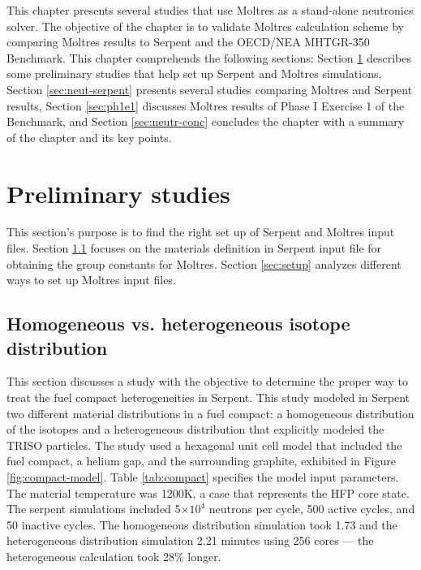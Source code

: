 \label{ch:neutronics}

This chapter presents several studies that use Moltres as a stand-alone neutronics solver.
The objective of the chapter is to validate Moltres calculation scheme by comparing Moltres results to Serpent and the OECD/NEA MHTGR-350 Benchmark.
This chapter comprehends the following sections: Section \ref{sec:neut-prelim} describes some preliminary studies that help set up Serpent and Moltres simulations, Section \ref{sec:neut-serpent} presents several studies comparing Moltres and Serpent results, Section \ref{sec:ph1e1} discusses Moltres results of Phase I Exercise 1 of the Benchmark, and Section \ref{sec:neutr-conc} concludes the chapter with a summary of the chapter and its key points.

\section{Preliminary studies}
\label{sec:neut-prelim}

This section's purpose is to find the right set up of Serpent and Moltres input files.
Section \ref{sec:homo-hetero} focuses on the materials definition in Serpent input file for obtaining the group constants for Moltres.
Section \ref{sec:setup} analyzes different ways to set up Moltres input files.

\subsection{Homogeneous vs. heterogeneous isotope distribution}
\label{sec:homo-hetero}

This section discusses a study with the objective to determine the proper way to treat the fuel compact heterogeneities in Serpent.
This study modeled in Serpent two different material distributions in a fuel compact: a homogeneous distribution of the isotopes and a heterogeneous distribution that explicitly modeled the TRISO particles.
The study used a hexagonal unit cell model that included the fuel compact, a helium gap, and the surrounding graphite, exhibited in Figure \ref{fig:compact-model}.
Table \ref{tab:compact} specifies the model input parameters.
The material temperature was 1200K, a case that represents the \gls{HFP} core state.
The serpent simulations included 5$\times 10^4$ neutrons per cycle, 500 active cycles, and 50 inactive cycles.
The homogeneous distribution simulation took 1.73 and the heterogeneous distribution simulation 2.21 minutes using 256 cores --- the heterogeneous calculation took 28$\%$ longer.

